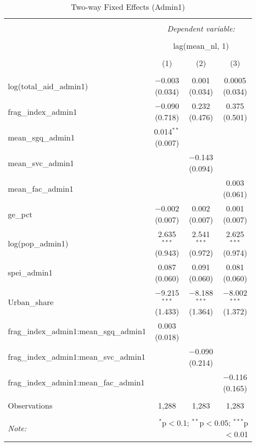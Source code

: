 
\begin{table}[!htbp] \centering 
  \caption{Two-way Fixed Effects (Admin1)} 
  \label{} 
\begin{tabular}{@{\extracolsep{5pt}}lccc} 
\\[-1.8ex]\hline 
\hline \\[-1.8ex] 
 & \multicolumn{3}{c}{\textit{Dependent variable:}} \\ 
\cline{2-4} 
\\[-1.8ex] & \multicolumn{3}{c}{lag(mean\_nl, 1)} \\ 
\\[-1.8ex] & (1) & (2) & (3)\\ 
\hline \\[-1.8ex] 
 log(total\_aid\_admin1) & $-$0.003 (0.034) & 0.001 (0.034) & 0.0005 (0.034) \\ 
  frag\_index\_admin1 & $-$0.090 (0.718) & 0.232 (0.476) & 0.375 (0.501) \\ 
  mean\_sgq\_admin1 & 0.014$^{**}$ (0.007) &  &  \\ 
  mean\_svc\_admin1 &  & $-$0.143 (0.094) &  \\ 
  mean\_fac\_admin1 &  &  & 0.003 (0.061) \\ 
  ge\_pct & $-$0.002 (0.007) & 0.002 (0.007) & 0.001 (0.007) \\ 
  log(pop\_admin1) & 2.635$^{***}$ (0.943) & 2.541$^{***}$ (0.972) & 2.625$^{***}$ (0.974) \\ 
  spei\_admin1 & 0.087 (0.060) & 0.091 (0.060) & 0.081 (0.060) \\ 
  Urban\_share & $-$9.215$^{***}$ (1.433) & $-$8.188$^{***}$ (1.364) & $-$8.002$^{***}$ (1.372) \\ 
  frag\_index\_admin1:mean\_sgq\_admin1 & 0.003 (0.018) &  &  \\ 
  frag\_index\_admin1:mean\_svc\_admin1 &  & $-$0.090 (0.214) &  \\ 
  frag\_index\_admin1:mean\_fac\_admin1 &  &  & $-$0.116 (0.165) \\ 
 \hline \\[-1.8ex] 
Observations & 1,288 & 1,283 & 1,283 \\ 
\hline 
\hline \\[-1.8ex] 
\textit{Note:}  & \multicolumn{3}{r}{$^{*}$p$<$0.1; $^{**}$p$<$0.05; $^{***}$p$<$0.01} \\ 
\end{tabular} 
\end{table} 

